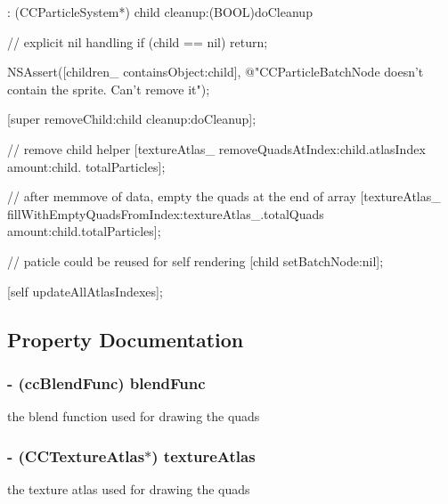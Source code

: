 \begin{DoxyCode}
                  : (CCParticleSystem*) child cleanup:(BOOL)doCleanup
{
        // explicit nil handling
        if (child == nil)
                return;

        NSAssert([children_ containsObject:child], @"CCParticleBatchNode
       doesn't contain the sprite. Can't remove it");

        [super removeChild:child cleanup:doCleanup];

        // remove child helper
        [textureAtlas_ removeQuadsAtIndex:child.atlasIndex amount:child.
      totalParticles];

        // after memmove of data, empty the quads at the end of array
        [textureAtlas_ fillWithEmptyQuadsFromIndex:textureAtlas_.totalQuads 
      amount:child.totalParticles];

        // paticle could be reused for self rendering
        [child setBatchNode:nil];

        [self updateAllAtlasIndexes];
}
\end{DoxyCode}


\subsection{Property Documentation}
\hypertarget{interface_c_c_particle_batch_node_a0b9e4c91f526e82daff2e1cb7f6d9988}{
\subsubsection[{blend\-Func}]{\setlength{\rightskip}{0pt plus 5cm}-\/ ({\bf cc\-Blend\-Func}) {\bf blend\-Func}}}\label{interface_c_c_particle_batch_node_a0b9e4c91f526e82daff2e1cb7f6d9988}
the blend function used for drawing the quads \hypertarget{interface_c_c_particle_batch_node_ac55a136114dcd1d3b7191448e0e0f70b}{
\subsubsection[{texture\-Atlas}]{\setlength{\rightskip}{0pt plus 5cm}-\/ ({\bf C\-C\-Texture\-Atlas}$\ast$) {\bf texture\-Atlas}}}\label{interface_c_c_particle_batch_node_ac55a136114dcd1d3b7191448e0e0f70b}
the texture atlas used for drawing the quads 

